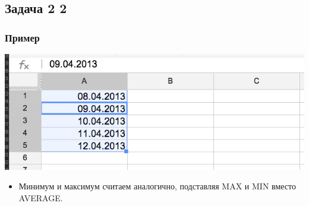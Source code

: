\documentclass[compress,red]{beamer}
\begin{document}
\subsection{Задача 2 2}
\begin{frame}[fragile]
  \frametitle{Пример}
  \centerline{\includegraphics[width=1.0\textwidth]{images/12.png}}
  \begin{itemize}[<+->]
      \item Минимум и максимум считаем аналогично, подставляя MAX и MIN вместо AVERAGE.
  \end{itemize}
\end{frame}
\end{document}
